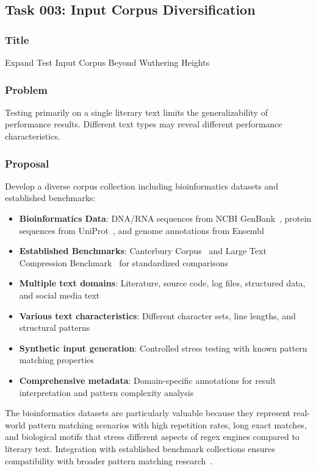 \documentclass[11pt,a4paper]{article}
\begin{document}
\subsection{Task 003: Input Corpus Diversification}

\subsubsection{Title}
Expand Test Input Corpus Beyond Wuthering Heights

\subsubsection{Problem}
Testing primarily on a single literary text limits the generalizability of performance results. Different text types may reveal different performance characteristics.

\subsubsection{Proposal}
Develop a diverse corpus collection including bioinformatics datasets and established benchmarks:
\begin{itemize}
    \item \textbf{Bioinformatics Data}: DNA/RNA sequences from NCBI GenBank~\cite{ncbi_genbank}, protein sequences from UniProt~\cite{uniprot2021}, and genome annotations from Ensembl~\cite{cunningham2022ensembl}
    \item \textbf{Established Benchmarks}: Canterbury Corpus~\cite{canterbury_corpus} and Large Text Compression Benchmark~\cite{large_text_benchmark} for standardized comparisons
    \item \textbf{Multiple text domains}: Literature, source code, log files, structured data, and social media text
    \item \textbf{Various text characteristics}: Different character sets, line lengths, and structural patterns
    \item \textbf{Synthetic input generation}: Controlled stress testing with known pattern matching properties
    \item \textbf{Comprehensive metadata}: Domain-specific annotations for result interpretation and pattern complexity analysis
\end{itemize}

The bioinformatics datasets are particularly valuable because they represent real-world pattern matching scenarios with high repetition rates, long exact matches, and biological motifs that stress different aspects of regex engines compared to literary text. Integration with established benchmark collections ensures compatibility with broader pattern matching research~\cite{altschul1990basic,gusfield1997algorithms}.
\end{document}
